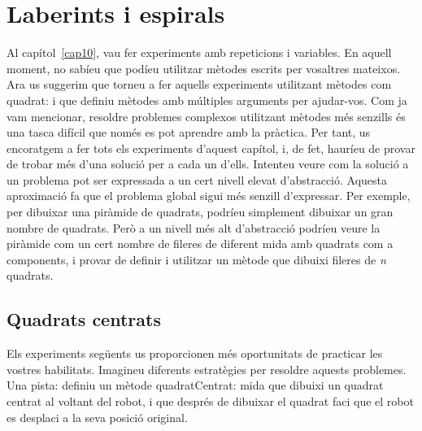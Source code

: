 \section{Laberints i espirals}
Al capítol~\ref{cap10}, vau fer experiments amb repeticions i variables. En aquell moment, no sabíeu que podíeu utilitzar mètodes escrits per vosaltres mateixos. Ara us suggerim que torneu a fer aquells experiments utilitzant mètodes com \textsf{quadrat:} i que definiu mètodes amb múltiples arguments per ajudar-vos. Com ja vam mencionar, resoldre problemes complexos utilitzant mètodes més senzills és una tasca difícil que només es pot aprendre amb la pràctica. Per tant, us encoratgem a fer tots els experiments d'aquest capítol, i, de fet, hauríeu de provar de trobar més d'una solució per a cada un d'ells. Intenteu veure com la solució a un problema pot ser expressada a un cert nivell elevat d'abstracció. Aquesta aproximació fa que el problema global sigui més senzill d'expressar. Per exemple, per dibuixar una piràmide de quadrats, podríeu simplement dibuixar un gran nombre de quadrats. Però a un nivell més alt d'abstracció podríeu veure la piràmide com un cert nombre de fileres de diferent mida amb quadrats com a components, i provar de definir i utilitzar un mètode que dibuixi fileres de \emph{n} quadrats.

\subsection{Quadrats centrats}
Els experiments següents us proporcionen més oportunitats de practicar les vostres habilitats. Imagineu diferents estratègies per resoldre aquests problemes. Una pista: definiu un mètode \textsf{quadratCentrat: mida} que dibuixi un quadrat centrat al voltant del robot, i que després de dibuixar el quadrat faci que el robot es desplaci a la seva posició original.

